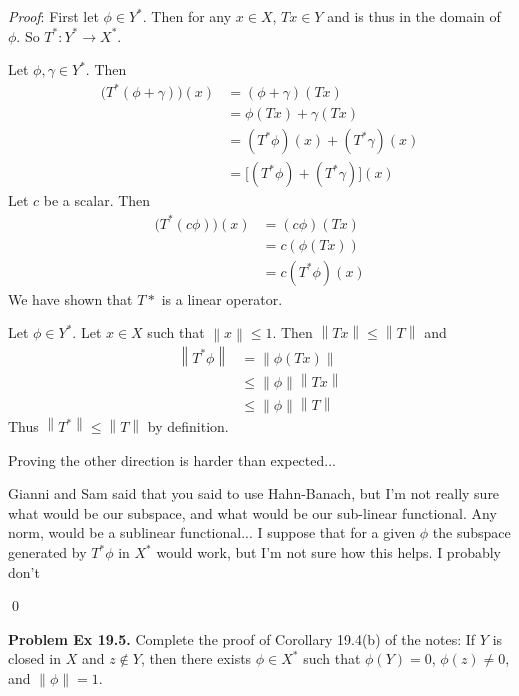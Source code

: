 \documentclass[12pt]{article}
\newcommand{\problem}[1]{\hspace{-4 ex} \large \textbf{Problem #1} }
\newcommand{\norm}[1]{\left\lVert#1\right\rVert}
\renewenvironment{proof}{\hspace{-4 ex} \emph{Proof}:}{\qed}
\begin{document}
	\begin{proof}
		First let $\phi \in Y^*$. Then for any $x \in X$, $Tx \in Y$ and is thus in the domain of $\phi$. So $T^*: Y^* \to X^*$. \bigbreak
		
		Let $\phi, \gamma \in Y^*$. Then 
		\begin{align*}
			\big(T^*(\phi + \gamma) \big)(x) & = (\phi + \gamma)(Tx) \\
			& = \phi(Tx) + \gamma(Tx) \\
			& = (T^*\phi)(x) + (T^*\gamma)(x) \\
			& = \big[(T^*\phi)+ (T^*\gamma)\big](x)
		\end{align*}
		Let $c$ be a scalar. Then
		\begin{align*}
			\big( T^*(c\phi) \big)(x) &= (c\phi)(Tx) \\
			& = c (\phi(Tx)) \\
			& = c(T^* \phi)(x)
		\end{align*}
		We have shown that $T*$ is a linear operator. \bigbreak
		
		Let $\phi \in Y^*$. Let $x \in X$ such that $\norm{x} \leq 1$. Then $\norm{Tx} \leq \norm{T}$ and
		\begin{align*}
			\norm{T^* \phi} & = \norm{\phi(Tx)} \\
			& \leq \norm{\phi} \norm{Tx} \\
			& \leq \norm{\phi}\norm{T}
		\end{align*}
		Thus $\norm{T^*} \leq \norm{T}$ by definition. \bigbreak
		
		Proving the other direction is harder than expected...
		
		Gianni and Sam said that you said to use Hahn-Banach, but I'm not really sure what would be our subspace, and what would be our sub-linear functional. Any norm, would be a sublinear functional... I suppose that for a given $\phi$ the subspace generated by $T^*\phi$ in $X^*$  would work, but I'm not sure how this helps. I probably don't 
		
	\end{proof}

\bigbreak
\problem{Ex 19.5.} Complete the proof of Corollary 19.4(b) of the notes: If $Y$ is closed in $X$ and $z\notin Y$, then there exists $\phi\in X^*$ such that $\phi(Y)=0$, $\phi(z)\neq0$, and $\norm{\phi}=1$. \bigbreak
\end{document}
